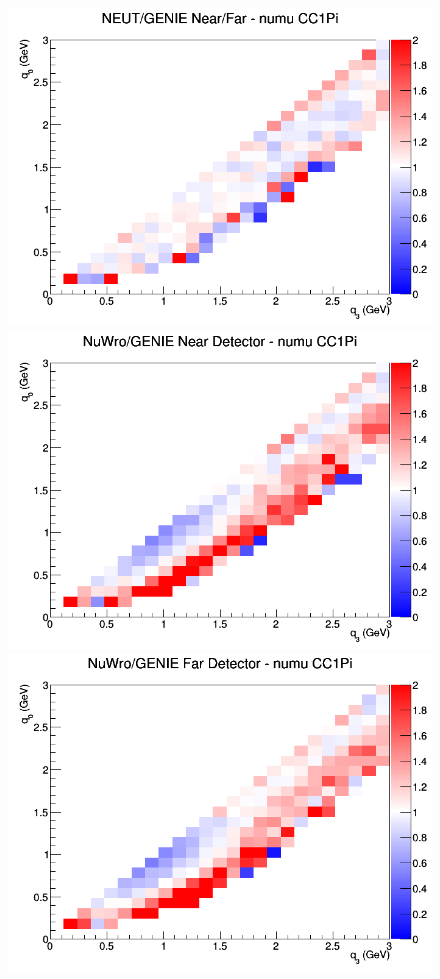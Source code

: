 \begin{figure}[h]
\endminipage
{}
\includegraphics[width=\linewidth]{q0_q3/nominal/ratios/CC1Pi_NEUT_GENIE_numu_NF_q3_q0.png}
\endminipage
\newline
{}
\includegraphics[width=\linewidth]{q0_q3/nominal/ratios/CC1Pi_NuWro_GENIE_numu_near_q3_q0.png}
\endminipage
{}
\includegraphics[width=\linewidth]{q0_q3/nominal/ratios/CC1Pi_NuWro_GENIE_numu_far_q3_q0.png}

\end{figure}
